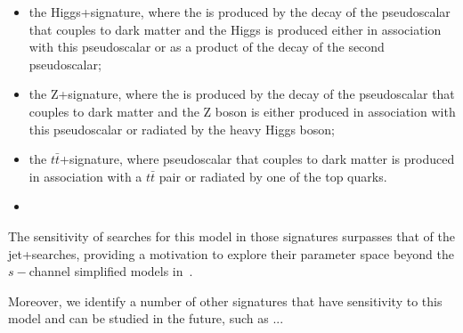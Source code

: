 \begin{itemize}
\item the Higgs+\MET signature, where the \MET is produced by the decay of the pseudoscalar that couples to dark matter and the Higgs is produced either in association with this pseudoscalar or as a product of the decay of the second pseudoscalar; 

\item the Z+\MET signature, where the \MET is produced by the decay of the pseudoscalar that couples to dark matter and the Z boson is either produced in association with this pseudoscalar or radiated by the heavy Higgs boson; 

\item the $t\bar{t}$+\MET signature, where pseudoscalar that couples to dark matter is produced in association with a $t\bar{t}$ pair or radiated by one of the top quarks. 

\item 
\end{itemize}

The sensitivity of searches for this model in those signatures surpasses that of the jet+\MET searches, providing a motivation to explore their parameter space beyond the $s-$channel simplified models in~\cite{Abercrombie:2015wmb}. 

Moreover, we identify a number of other signatures that have sensitivity to this model and can be studied in the future, such as ...